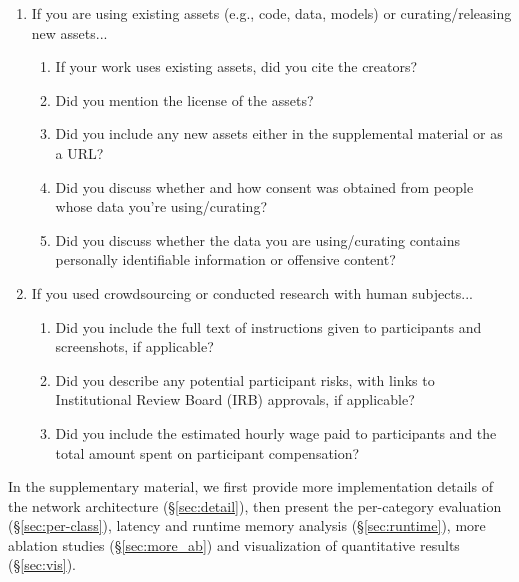 \documentclass{article}
\begin{document}
\begin{enumerate}
\item If you are using existing assets (e.g., code, data, models) or curating/releasing new assets...
\begin{enumerate}
  \item If your work uses existing assets, did you cite the creators?
  \item Did you mention the license of the assets?
    \answerNA{}
  \item Did you include any new assets either in the supplemental material or as a URL?
  \item Did you discuss whether and how consent was obtained from people whose data you're using/curating?
  \item Did you discuss whether the data you are using/curating contains personally identifiable information or offensive content?
\end{enumerate}


\item If you used crowdsourcing or conducted research with human subjects...
\begin{enumerate}
  \item Did you include the full text of instructions given to participants and screenshots, if applicable?
  \item Did you describe any potential participant risks, with links to Institutional Review Board (IRB) approvals, if applicable?
  \item Did you include the estimated hourly wage paid to participants and the total amount spent on participant compensation?
\end{enumerate}


\end{enumerate}


\appendix
In the supplementary material, we first provide more implementation details of the network architecture (\S \ref{sec:detail}), then present the per-category evaluation (\S \ref{sec:per-class}), latency and runtime memory analysis (\S \ref{sec:runtime}), more ablation studies (\S \ref{sec:more_ab}) and visualization of quantitative results (\S \ref{sec:vis}).
\end{document}
